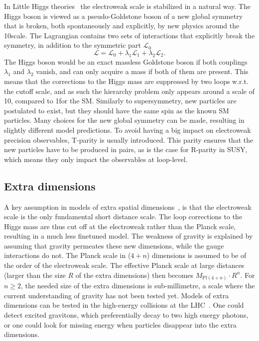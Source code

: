 In Little Higgs theories~\cite{Cheng:2007bu,Reuter:2012sd,Schmaltz:2005ky} the electroweak scale is
stabilized in a natural way. 
The Higgs boson is viewed as a pseudo-Goldstone boson of a new global symmetry that is broken,
both spontaneously and explicitly, by new physics around the 10\TeV scale. 
The Lagrangian contains two sets of interactions that explicitly break the symmetry, in addition to
the symmetric part $\mathcal{L}_0$
\begin{equation}
  \mathcal{L} = \mathcal{L}_0 + \lambda_1 \mathcal{L}_1 + \lambda_2 \mathcal{L}_2 .
\end{equation}
The Higgs boson would be an exact massless Goldstone boson if both couplings $\lambda_1$ and
$\lambda_2$ vanish, and can only acquire a mass if both of them are present. This means that
the corrections to the Higgs mass are suppressed by two loops w.r.t. the cutoff scale, and as such
the hierarchy problem only appears around a scale of 10\TeV, compared to 1\TeV for the SM. 
Similarly to supersymmetry, new particles are postulated to exist, but they should have the same 
spin as the known SM particles. 
Many choices for the new global symmetry can be made, resulting in slightly different model
predictions. To avoid having a big impact on electroweak precision observables, T-parity is usually
introduced. This parity ensures that the new particles have to be produced in pairs, as is the case
for R-parity in SUSY, which means they only impact the observables at loop-level. 

\subsection{Extra dimensions \label{sec:extra_dimensions}}

A key assumption in models of extra spatial dimensions~\cite{ArkaniHamed:1998rs}, is that the
electroweak scale is the only fundamental short distance scale. The loop corrections to the Higgs
mass are thus cut off at the electroweak rather than the Planck scale, resulting in a much less
finetuned model.  
The weakness of gravity is explained by assuming that gravity permeates these new dimensions, while
the gauge interactions do not. 
The Planck scale in ($4+n$) dimensions is assumed to be of the order of the electroweak scale.  
The effective Planck scale at large distances (larger than the size $R$ of the extra dimensions)
then becomes $M_{\text{Pl}(4+n)}\cdot R^n$. For $n\geq 2$, the needed size of the extra dimensions
is sub-millimetre, a scale where the current understanding of gravity has not been tested yet. 
Models of extra dimensions can be tested in the high-energy collisions at the
LHC~\cite{Chatrchyan:2011fq}. One could detect excited gravitons, which preferentially decay to two
high energy photons, or one could look for missing energy when particles disappear into the extra
dimensions. 
